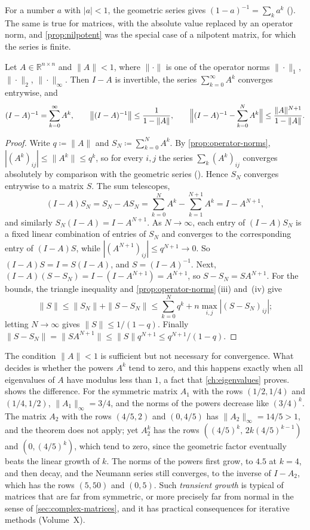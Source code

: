 For a number $a$ with $|a|<1$, the geometric series gives $(1-a)^{-1}=\sum_ka^k$ (). The same is true for matrices, with the absolute value replaced by an operator norm, and \cref{prop:nilpotent} was the special case of a nilpotent matrix, for which the series is finite.

\begin{theorem}
\label{thm:neumann}
Let $A\in\mathbb R^{n\times n}$ and $\|A\|<1$, where $\|\cdot\|$ is one of the operator norms $\|\cdot\|_1$, $\|\cdot\|_2$, $\|\cdot\|_\infty$. Then $I-A$ is invertible, the series $\sum_{k=0}^\infty A^k$ converges entrywise, and
\[
(I-A)^{-1}=\sum_{k=0}^\infty A^k,\qquad\bigl\|(I-A)^{-1}\bigr\|\le\frac1{1-\|A\|},\qquad\Bigl\|(I-A)^{-1}-\sum_{k=0}^NA^k\Bigr\|\le\frac{\|A\|^{N+1}}{1-\|A\|}.
\]
\end{theorem}

\begin{proof}
Write $q\coloneqq\|A\|$ and $S_N\coloneqq\sum_{k=0}^NA^k$. By \cref{prop:operator-norms}, $|(A^k)_{ij}|\le\|A^k\|\le q^k$, so for every $i,j$ the series $\sum_k(A^k)_{ij}$ converges absolutely by comparison with the geometric series (). Hence $S_N$ converges entrywise to a matrix $S$. The sum telescopes,
\[
(I-A)S_N=S_N-AS_N=\sum_{k=0}^NA^k-\sum_{k=1}^{N+1}A^k=I-A^{N+1},
\]
and similarly $S_N(I-A)=I-A^{N+1}$. As $N\to\infty$, each entry of $(I-A)S_N$ is a fixed linear combination of entries of $S_N$ and converges to the corresponding entry of $(I-A)S$, while $|(A^{N+1})_{ij}|\le q^{N+1}\to0$. So $(I-A)S=I=S(I-A)$, and $S=(I-A)^{-1}$. Next, $(I-A)(S-S_N)=I-(I-A^{N+1})=A^{N+1}$, so $S-S_N=SA^{N+1}$. For the bounds, the triangle inequality and \cref{prop:operator-norms}\,(iii) and~(iv) give
\[
\|S\|\le\|S_N\|+\|S-S_N\|\le\sum_{k=0}^Nq^k+n\max_{i,j}|(S-S_N)_{ij}| ;
\]
letting $N\to\infty$ gives $\|S\|\le1/(1-q)$. Finally $\|S-S_N\|=\|SA^{N+1}\|\le\|S\|q^{N+1}\le q^{N+1}/(1-q)$.
\end{proof}

The condition $\|A\|<1$ is sufficient but not necessary for convergence. What decides is whether the powers $A^k$ tend to zero, and this happens exactly when all eigenvalues of $A$ have modulus less than $1$, a fact that \cref{ch:eigenvalues} proves.  shows the difference. For the symmetric matrix $A_1$ with the rows $(1/2,1/4)$ and $(1/4,1/2)$, $\|A_1\|_\infty=3/4$, and the norms of the powers decrease like $(3/4)^k$. The matrix $A_2$ with the rows $(4/5,2)$ and $(0,4/5)$ has $\|A_2\|_\infty=14/5>1$, and the theorem does not apply; yet $A_2^k$ has the rows $((4/5)^k,\,2k(4/5)^{k-1})$ and $(0,(4/5)^k)$, which tend to zero, since the geometric factor eventually beats the linear growth of $k$. The norms of the powers first grow, to $4.5$ at $k=4$, and then decay, and the Neumann series still converges, to the inverse of $I-A_2$, which has the rows $(5,50)$ and $(0,5)$. Such \emph{transient growth} is typical of matrices that are far from symmetric, or more precisely far from normal in the sense of \cref{sec:complex-matrices}, and it has practical consequences for iterative methods (Volume~X).

